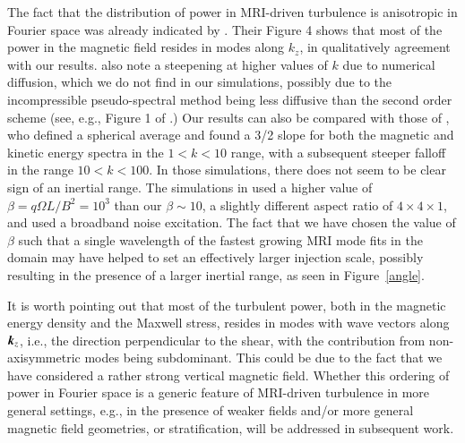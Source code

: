 \documentclass[]{emulateapj}
\newcommand\bb[1]{\mbox{\boldmath{$#1$}}}
\begin{document}
The fact that the distribution of power in MRI-driven turbulence is anisotropic in Fourier space 
was already indicated by \citet{Hawley:1995gd}. Their Figure 4 shows that most of the power 
in the magnetic field resides in modes along $k_z$, in qualitatively agreement with our results.
\citet{Hawley:1995gd} also note a steepening at higher values of $k$ due to numerical diffusion, 
which we do not find in our simulations, possibly due to the incompressible pseudo-spectral 
method being less diffusive than the second order scheme (see, e.g., Figure 1 of \citealt{Brandenburg:2001us}.) 
Our results can also be compared with those of \citet{Lesur:2011jh}, who defined a spherical 
average and found a 3/2 slope for both the magnetic and kinetic energy spectra in the $1 < k < 10$ 
range, with a subsequent steeper falloff in the range $10<k<100$.
In those simulations, there does not seem to be clear sign of an inertial range.
The simulations in \citet{Lesur:2011jh} used a higher value of $\beta=q\Omega L/B^2=10^3$ 
than our $\beta \sim 10$, a slightly different aspect ratio of $4 \times 4 \times 1$, 
and used a broadband noise excitation. The fact that we have chosen the value of
$\beta$ such that a single wavelength of the fastest growing MRI mode fits in the
domain may have helped to set an effectively larger injection scale, possibly resulting
in the presence of a larger inertial range, as seen in Figure~\ref{angle}.


It is worth pointing out that most of the turbulent power, both in the magnetic energy
density and the Maxwell stress, resides in modes with wave vectors along $\bb{k}_z$, i.e., 
the direction perpendicular to the shear, with the contribution from non-axisymmetric modes
being subdominant. This could be due to the fact that we have considered a rather
strong vertical magnetic field. Whether this ordering of power in Fourier space is a 
generic feature of MRI-driven turbulence in more general settings, e.g., in the presence 
of weaker fields and/or more general magnetic field geometries, or stratification, will be 
addressed in subsequent work.
\end{document}
